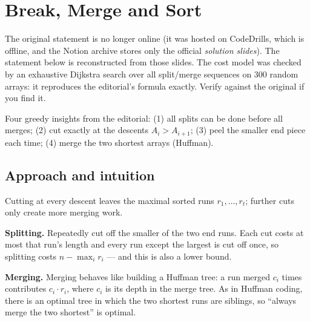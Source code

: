 \section{Break, Merge and Sort}
\label{sec:g-break-merge}

\begin{reconbox}
The original statement is no longer online (it was hosted on CodeDrills, which
is offline, and the Notion archive stores only the official \emph{solution
slides}). The statement below is reconstructed from those slides. The cost
model was checked by an exhaustive Dijkstra search over all split/merge
sequences on 300 random arrays: it reproduces the editorial's formula exactly.
Verify against the original if you find it.
\end{reconbox}


\begin{patternbox}
Four greedy insights from the editorial: (1) all splits can be done before
all merges; (2) cut exactly at the descents $A_i>A_{i+1}$; (3) peel the
smaller end piece each time; (4) merge the two shortest arrays (Huffman).
\end{patternbox}

\subsection*{Approach and intuition}

Cutting at every descent leaves the maximal sorted runs $r_1,\dots,r_t$;
further cuts only create more merging work.

\textbf{Splitting.} Repeatedly cut off the smaller of the two end runs. Each
cut costs at most that run's length and every run except the largest is cut
off once, so splitting costs $n-\max_i r_i$ --- and this is also a lower
bound.

\textbf{Merging.} Merging behaves like building a Huffman tree: a run merged
$c_i$ times contributes $c_i\cdot r_i$, where $c_i$ is its depth in the merge
tree. As in Huffman coding, there is an optimal tree in which the two
shortest runs are siblings, so ``always merge the two shortest'' is optimal.

